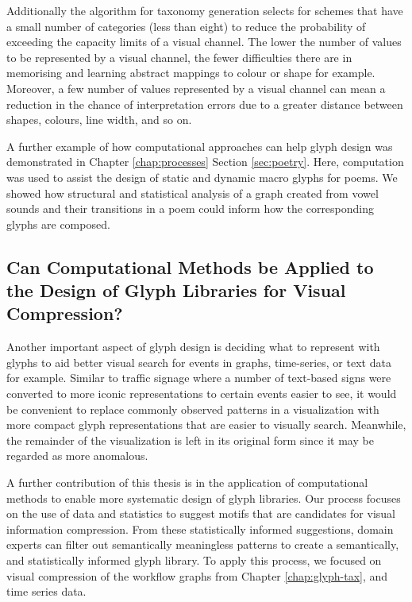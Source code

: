 Additionally the algorithm for taxonomy generation selects for schemes that have a small number of categories (less than eight) to reduce the probability of exceeding the capacity limits of a visual channel.
The lower the number of values to be represented by a visual channel, the fewer difficulties there are in memorising and learning abstract mappings to colour or shape for example.
Moreover, a few number of values represented by a visual channel can mean a reduction in the chance of interpretation errors due to a greater distance between shapes, colours, line width, and so on.

A further example of how computational approaches can help glyph design was demonstrated in Chapter \ref{chap:processes} Section \ref{sec:poetry}.
Here, computation was used to assist the design of static and dynamic macro glyphs for poems.
We showed how structural and statistical analysis of a graph created from vowel sounds and their transitions in a poem could inform how the corresponding glyphs are composed.

\subsection{Can Computational Methods be Applied to the Design of Glyph Libraries for Visual Compression?}

Another important aspect of glyph design is deciding what to represent with glyphs to aid better visual search for events in graphs, time-series, or text data for example.
Similar to traffic signage where a number of text-based signs were converted to more iconic representations to certain events easier to see, it would be convenient to replace commonly observed patterns in a visualization with more compact glyph representations that are easier to visually search.
Meanwhile, the remainder of the visualization is left in its original form since it may be regarded as more anomalous.

A further contribution of this thesis is in the application of computational methods to enable more systematic design of glyph libraries.
Our process focuses on the use of data and statistics to suggest motifs that are candidates for visual information compression.
From these statistically informed suggestions, domain experts can filter out semantically meaningless patterns to create a semantically, and statistically informed glyph library.
To apply this process, we focused on visual compression of the workflow graphs from Chapter \ref{chap:glyph-tax}, and time series data.

